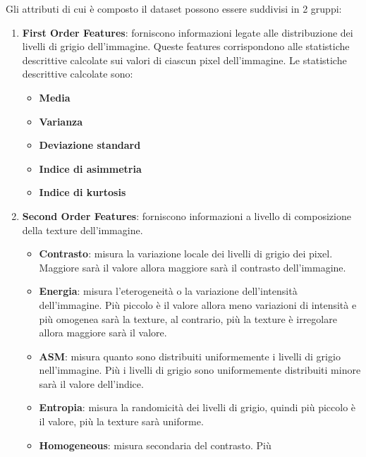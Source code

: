 Gli attributi di cui è composto il dataset possono essere suddivisi in 2 gruppi\cite{explanation-features}:
\begin{enumerate}
      \item \textbf{First Order Features}: forniscono informazioni legate alle
            distribuzione dei livelli di grigio dell'immagine. Queste features
            corrispondono alle statistiche descrittive calcolate sui valori di
            ciascun pixel dell'immagine. Le statistiche descrittive calcolate sono:
            \begin{itemize}
                  \item \textbf{Media}
                  \item \textbf{Varianza}
                  \item \textbf{Deviazione standard}
                  \item \textbf{Indice di asimmetria}
                  \item \textbf{Indice di kurtosis}
            \end{itemize}
      \item \textbf{Second Order Features}: forniscono informazioni a livello di
            composizione della texture dell'immagine.
            \begin{itemize}
                  \item \textbf{Contrasto}: misura la variazione locale dei livelli
                        di grigio dei pixel. Maggiore sarà il valore allora maggiore
                        sarà il contrasto dell'immagine.
                  \item \textbf{Energia}: misura l'eterogeneità o la variazione
                        dell'intensità dell'immagine. Più piccolo è il valore allora
                        meno variazioni di intensità e più omogenea sarà la texture,
                        al contrario, più la texture è irregolare allora maggiore
                        sarà il valore.
                  \item \textbf{ASM}: misura quanto sono distribuiti uniformemente i
                        livelli di grigio nell'immagine. Più i livelli di grigio sono
                        uniformemente distribuiti minore sarà il valore dell'indice.
                  \item \textbf{Entropia}: misura la randomicità dei livelli di
                        grigio, quindi più piccolo è il valore, più la texture
                        sarà uniforme.
                  \item \textbf{Homogeneous}: misura secondaria del contrasto. Più

\end{itemize}
\end{enumerate}
